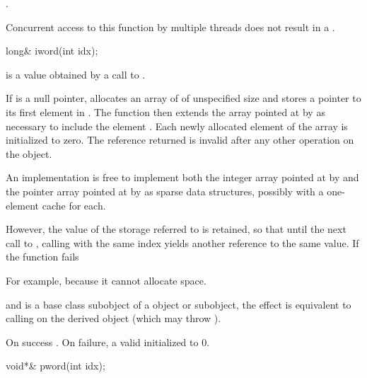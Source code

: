 \begin{itemdescr}
\pnum
\returns
{}
\tcode{++}.

\pnum
\remarks
Concurrent access to this function by multiple threads does not result in a
.
\end{itemdescr}

%
\begin{itemdecl}
long& iword(int idx);
\end{itemdecl}

\begin{itemdescr}
\pnum
\expects
{} is a value obtained by a call to .

\pnum
\effects
If  is a null pointer, allocates an array of
of unspecified size and stores a pointer to its first element in
.
The function then extends the array pointed at by
 as necessary to include the element
.
Each newly allocated element of the array is initialized to zero.
The reference returned is invalid after any other operation on the
object.
\begin{footnote}
An implementation is free to implement both the integer
array pointed at by  and the pointer array pointed at by
 as sparse data structures, possibly with a one-element
cache for each.
\end{footnote}
However, the value of the storage referred to is retained, so
that until the next call to
,
calling
with the same index yields another reference to the same value.
If the function fails
\begin{footnote}
For example, because it cannot allocate space.
\end{footnote}
and
is a base class subobject of a
object or subobject, the effect is equivalent to calling
on the derived object (which may throw
).

\pnum
\returns
On success
.
On failure, a valid
initialized to 0.
\end{itemdescr}

%
\begin{itemdecl}
void*& pword(int idx);
\end{itemdecl}

